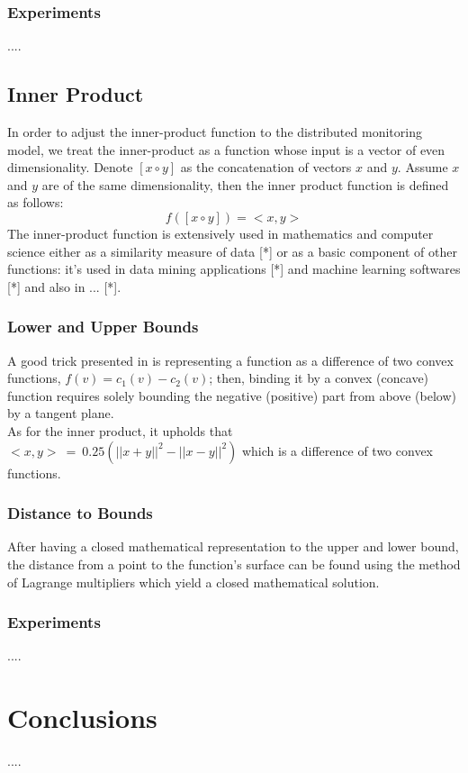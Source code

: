 \documentclass[10pt, conference]{IEEEtran}
\begin{document}
\subsubsection{Experiments}
.... \\
\subsection{Inner Product}
In order to adjust the inner-product function to the distributed monitoring model, we treat the inner-product as a function whose input is a vector of even dimensionality. Denote ${[x \circ y]}$ as the concatenation of vectors $x$ and $y$. Assume $x$ and $y$ are of the same dimensionality, then the inner product function is defined as follows:
\begin{equation}
f([x \circ y]) = <x, y>
\end{equation}
The inner-product function is extensively used in mathematics and computer science either as a similarity measure of data [*] or as a basic component of other functions: it's used in data mining applications [*] and machine learning softwares [*] and also in ... [*]. \\
\subsubsection{Lower and Upper Bounds}
A good trick presented in \cite{lazerson2015monitoring} is representing a function as a difference of two convex functions, ${f(v) = c_1(v)-c_2(v)}$; then, binding it by a convex (concave) function requires solely bounding the negative (positive) part from above (below) by a tangent plane. \\
As for the inner product, it upholds that ${<x,y> \ = \ 0.25(||x+y||^2-||x-y||^2)}$ which is a difference of two convex functions. \\
\subsubsection{Distance to Bounds}
After having a closed mathematical representation to the upper and lower bound, the distance from a point to the function's surface can be found using the method of Lagrange multipliers which yield a closed mathematical solution. \\
\subsubsection{Experiments}
....

\section{Conclusions}
....




\end{document}
